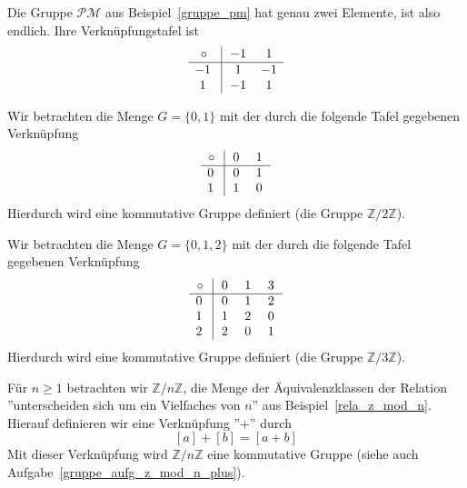 \begin{beispiel} Die Gruppe $\mathcal{PM}$ aus Beispiel~\ref{gruppe_pm} hat genau zwei Elemente, ist also 
endlich. Ihre Verknüpfungstafel ist
  $$ \begin{array} { c | c c }
  \circ \, & \, -1 \, & \, 1 \,  \\ \hline
  -1\, \, & 1 & -1  \\
  1\, \, & -1 & 1  \\
  \end{array} $$
\end{beispiel}

\begin{beispiel} Wir betrachten die Menge $G = \{0, 1\}$ mit der durch die folgende Tafel gegebenen 
Verknüpfung
  $$ \begin{array} { c | c c }
  \circ \, & \, 0 \, & \, 1 \,   \\ \hline
  0\, \, & 0 & 1  \\
  1\, \, & 1 & 0  \\
  \end{array} $$
Hierdurch wird eine kommutative Gruppe definiert (die Gruppe $\mathbb Z/ 2 \mathbb Z$).
\end{beispiel}

\begin{beispiel} Wir betrachten die Menge $G = \{0, 1, 2\}$ mit der durch die folgende Tafel gegebenen 
Verknüpfung
  $$ \begin{array} { c | c c c c }
  \circ \, & \, 0 \, & \, 1 \,  & \, 3 \,  \\ \hline
  0\, \, & 0 & 1 & 2  \\
  1\, \, & 1 & 2 & 0  \\
  2\, \, & 2 & 0 & 1 \\
  \end{array} $$
Hierdurch wird eine kommutative Gruppe definiert (die Gruppe $\mathbb Z/ 3 \mathbb Z$).
\end{beispiel}

\begin{beispiel}\label{gruppe_z_mod_n_plus} Für $n \geq 1$ betrachten wir $\mathbb Z/n \mathbb Z$, 
die Menge der Äquivalenzklassen der Relation 
''unterscheiden sich um ein Vielfaches von $n$'' aus Beispiel~\ref{rela_z_mod_n}. Hierauf definieren wir 
eine Verknüpfung ''+'' durch 
  $$ [a] + [b] = [a+b] $$
Mit dieser Verknüpfung wird $\mathbb Z/n \mathbb Z$ eine kommutative Gruppe (siehe auch 
Aufgabe~\ref{gruppe_aufg_z_mod_n_plus}).
\end{beispiel}


